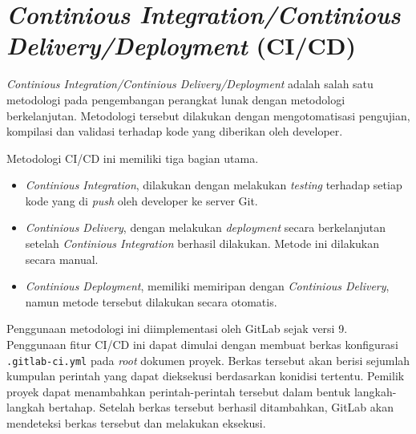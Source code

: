 \section{\textit{Continious Integration/Continious Delivery/Deployment} (CI/CD)}

    \textit{Continious Integration/Continious Delivery/Deployment} adalah salah
    satu metodologi pada pengembangan perangkat lunak dengan metodologi
    berkelanjutan. Metodologi tersebut dilakukan dengan mengotomatisasi
    pengujian, kompilasi dan validasi terhadap kode yang diberikan oleh
    developer\cite{gitlab-cicd:methodologies}.
    
    Metodologi CI/CD ini memiliki tiga bagian
    utama\cite{gitlab-cicd:methodologies}.
    \begin{itemize}
        \item \textit{Continious Integration}, dilakukan dengan melakukan
        \textit{testing} terhadap setiap kode yang di \textit{push} oleh
        developer ke server Git.
        
        \item \textit{Continious Delivery}, dengan melakukan \textit{deployment}
        secara berkelanjutan setelah \textit{Continious Integration} berhasil
        dilakukan. Metode ini dilakukan secara manual.
        
        \item \textit{Continious Deployment}, memiliki memiripan dengan
        \textit{Continious Delivery}, namun metode tersebut dilakukan secara
        otomatis.
    \end{itemize}
    
    Penggunaan metodologi ini diimplementasi oleh GitLab sejak versi
    9\cite{gitlab-cicd:introduction}.  Penggunaan fitur CI/CD ini dapat dimulai
    dengan membuat berkas konfigurasi \texttt{.gitlab-ci.yml} pada \textit{root}
    dokumen proyek. Berkas tersebut akan berisi sejumlah kumpulan perintah yang
    dapat dieksekusi berdasarkan konidisi tertentu. Pemilik proyek dapat
    menambahkan perintah-perintah tersebut dalam bentuk langkah-langkah
    bertahap. Setelah berkas tersebut berhasil ditambahkan, GitLab akan
    mendeteksi berkas tersebut dan melakukan eksekusi.
    
